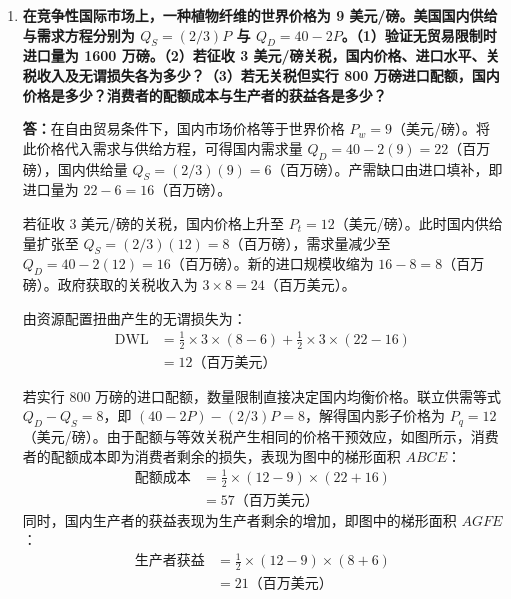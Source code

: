 \begin{enumerate}[label=\textbf{\arabic*.}, leftmargin=*]
\begin{center}
		\end{center}
		
		
		\item \textbf{在竞争性国际市场上，一种植物纤维的世界价格为 9 美元/磅。美国国内供给与需求方程分别为 $Q_S = (2/3)P$ 与 $Q_D = 40 - 2P$。（1）验证无贸易限制时进口量为 1600 万磅。（2）若征收 3 美元/磅关税，国内价格、进口水平、关税收入及无谓损失各为多少？（3）若无关税但实行 800 万磅进口配额，国内价格是多少？消费者的配额成本与生产者的获益各是多少？}
		
		\textbf{答：}在自由贸易条件下，国内市场价格等于世界价格 $P_w = 9$（美元/磅）。将此价格代入需求与供给方程，可得国内需求量 $Q_D = 40 - 2(9) = 22$（百万磅），国内供给量 $Q_S = (2/3)(9) = 6$（百万磅）。产需缺口由进口填补，即进口量为 $22 - 6 = 16$（百万磅）。
		
		若征收 3 美元/磅的关税，国内价格上升至 $P_t = 12$（美元/磅）。此时国内供给量扩张至 $Q_S = (2/3)(12) = 8$（百万磅），需求量减少至 $Q_D = 40 - 2(12) = 16$（百万磅）。新的进口规模收缩为 $16 - 8 = 8$（百万磅）。政府获取的关税收入为 $3 \times 8 = 24$（百万美元）。
		
		由资源配置扭曲产生的无谓损失为：
		\[
		\begin{aligned}
			\text{DWL} &= \frac{1}{2} \times 3 \times (8 - 6) + \frac{1}{2} \times 3 \times (22 - 16) \\
			&= 12 \text{（百万美元）}
		\end{aligned}
		\]
		
		若实行 800 万磅的进口配额，数量限制直接决定国内均衡价格。联立供需等式 $Q_D - Q_S = 8$，即 $(40 - 2P) - (2/3)P = 8$，解得国内影子价格为 $P_q = 12$（美元/磅）。由于配额与等效关税产生相同的价格干预效应，如图所示，消费者的配额成本即为消费者剩余的损失，表现为图中的梯形面积 $ABCE$：
		\[
		\begin{aligned}
			\text{配额成本} &= \frac{1}{2} \times (12 - 9) \times (22 + 16) \\
			&= 57 \text{（百万美元）}
		\end{aligned}
		\]
		同时，国内生产者的获益表现为生产者剩余的增加，即图中的梯形面积 $AGFE$：
		\[
		\begin{aligned}
			\text{生产者获益} &= \frac{1}{2} \times (12 - 9) \times (8 + 6) \\
			&= 21 \text{（百万美元）}
		\end{aligned}
		\]
		

\end{enumerate}
